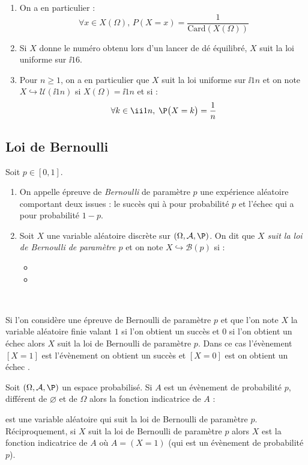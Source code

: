 \documentclass[french,11pt,twoside]{VcCours}
\begin{document}
\begin{Exemples}{}
\begin{enumerate}
\item On a en particulier :
$$ \forall x \in X(\Omega), \, P(X=x) = \dfrac{1}{\textrm{Card}(X(\Omega))}$$
\item Si $X$ donne le numéro obtenu lors d'un lancer de dé équilibré, $X$ suit la loi uniforme sur $\ii{1}{6}$.
\item Pour $n \geq 1$, on a en particulier que $X$ suit la loi uniforme sur $\ii 1n$ et on note $X \hookrightarrow \mathcal{U}(\ii 1n)$ si $X(\Omega)= \ii 1n$ et si :
 $$ \forall k \in \ii 1n,\; \P\big(X=k\big)=  \frac 1n $$
\end{enumerate}
\end{Exemples}
\subsection{Loi de Bernoulli}
\begin{Definition}{}
Soit $p \in [0,1]$.
\begin{enumerate}
\item On appelle épreuve de \emph{Bernoulli} de paramètre $p$ une expérience aléatoire comportant deux issues : le succès qui à pour probabilité $p$ et l'échec qui a pour probabilité $1-p$.
\item Soit $X$ une variable aléatoire discrète sur $(\Omega, \mathcal{A},\P)$. On dit que \emph{$X$ suit la loi de Bernoulli de paramètre $p$} et on note $X \hookrightarrow \mathcal{B}(p)$ si :
\begin{itemize}
 \item {}
 \item \phantom{$ \P\big(X=1\big)= p$ et $\P\big(X=0\big)=1-p$.}
\end{itemize}
$\phantom{}$
\end{enumerate}
\end{Definition}

Si l'on considère une épreuve de Bernoulli de paramètre $p$ et que l'on note $X$ la variable aléatoire finie valant $1$ si l'on obtient un succès et $0$ si l'on obtient un échec alors $X$ suit la loi de Bernoulli de paramètre $p$. Dans ce cas l'évènement $[X=1]$ est l'évènement \og on obtient un succès \fg et $[X=0]$ est \og on obtient un échec \fg .

\begin{Remarque}{} Soit $(\Omega, \mathcal{A}, \P)$ un espace probabilisé. Si $A$ est un évènement de probabilité $p$, différent de $\varnothing$ et de $\Omega$ alors la fonction indicatrice de $A$ :

\vspace{2cm}

est une variable aléatoire qui suit la loi de Bernoulli de paramètre $p$. Réciproquement, si $X$ suit la loi de Bernoulli de paramètre $p$ alors $X$ est la fonction indicatrice de $A$ où $A=(X=1)$ (qui est un évènement de probabilité $p$).
\end{Remarque}
\end{document}

